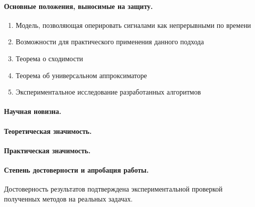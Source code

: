 \documentclass[12pt]{article}
\begin{document}
\paragraph{Основные положения, выносимые на защиту.}
\begin{enumerate}
  \item Модель, позволяющая оперировать сигналами как непрерывными по времени
  \item Возможности для практического применения данного подхода
  \item Теорема о сходимости
  \item Теорема об универсальном аппроксиматоре
  \item Экспериментальное исследование разработанных алгоритмов
\end{enumerate}

\paragraph{Научная новизна.}

\paragraph{Теоретическая значимость.}

\paragraph{Практическая значимость.}


\paragraph{Степень достоверности и апробация работы.}
Достоверность результатов подтверждена экспериментальной проверкой полученных методов на реальных задачах.

\newpage
\end{document}
